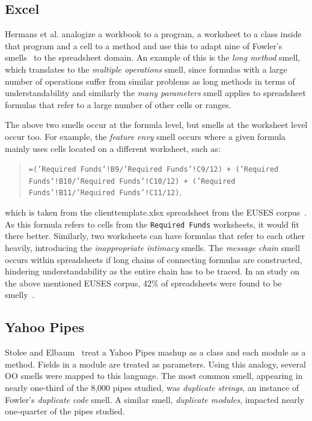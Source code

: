 \documentclass{sig-alternate}
\begin{document}
 \subsection{Excel}
Hermans et al. \cite{Hermans2012inter,Hermans2012intra} analogize a workbook to a program, a worksheet to a class inside that program and a cell to a method and use this to adapt nine of Fowler's smells~\cite{Fowl1999} to the spreadsheet domain.
An example of this is the \emph{long method} smell, which translates to the \emph{multiple operations} smell, since formulas with a large number of operations suffer from similar problems as long methods in terms of understandability and similarly the \emph{many parameters} smell applies to spreadsheet formulas that refer to a large number of other cells or ranges. 

The above two smells occur at the formula level, but smells at the worksheet level occur too. For example, the \emph{feature envy} smell occurs where a given formula mainly uses cells located on a different worksheet, such as: \begin{quote} \begin{small}{\tt =('Required Funds'!B9/'Required Funds'!C9/12) + ('Required Funds'!B10/'Required Funds'!C10/12) + ('Required Funds'!B11/'Required Funds'!C11/12)}, \end{small}\end{quote} which is taken from the clienttemplate.xlsx spreadsheet from the EUSES corpus~\cite{fisher2005euses}. As this formula refers to cells from the {\tt Required Funds} worksheets, it would fit there better. Similarly, two worksheets can have formulas that refer to each other heavily, introducing the \emph{inappropriate intimacy} smells. The \emph{message chain} smell occurs within spreadsheets if long chains of connecting formulas are constructed, hindering understandability as the entire chain has to be traced. In an study on the above mentioned EUSES corpus, 42\% of spreadsheets were found to be smelly~\cite{Hermans2012intra}.

\subsection{Yahoo Pipes}
Stolee and Elbaum~\cite{Stolee2011, StoleeTSE2013} treat a Yahoo Pipes mashup as a class and each module as a method.  Fields in a module are treated as parameters. Using this analogy,  several OO smells were mapped to this language. The most common smell, appearing in nearly one-third of the 8,000 pipes studied, was \emph{duplicate strings}, an instance of Fowler's \emph{duplicate code} smell. 
A similar smell, \emph{duplicate modules}, impacted nearly one-quarter of the pipes studied. 
 
\end{document}

